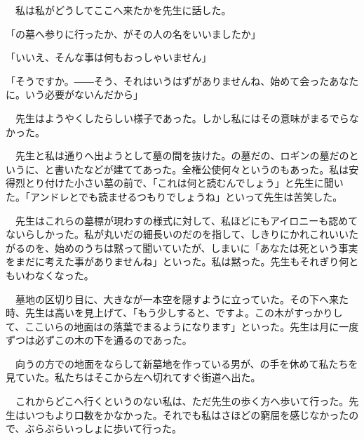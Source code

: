 \documentclass[a4j,onecolumn]{tarticle}
\begin{document}
　私は私がどうしてここへ来たかを先生に話した。\hbox{}\par{}
「の墓へ参りに行ったか、\hbox{}がその人の名をいいましたか」\par{}
「いいえ、\hbox{}そんな事は何もおっしゃいません」\par{}
「そうですか。\hbox{}――そう、\hbox{}それはいうはずがありませんね、\hbox{}始めて会ったあなたに。\hbox{}いう必要がないんだから」\par{}
　先生はようやくしたらしい様子であった。\hbox{}しかし私にはその意味がまるでらなかった。\hbox{}\par{}
　先生と私は通りへ出ようとして墓の間を抜けた。\hbox{}の墓だの、\hbox{}ロギンの墓だのというに、\hbox{}と書いたなどが建ててあった。\hbox{}全権公使何々というのもあった。\hbox{}私は安得烈とり付けた小さい墓の前で、\hbox{}「これは何と読むんでしょう」と先生に聞いた。\hbox{}「アンドレとでも読ませるつもりでしょうね」といって先生は苦笑した。\hbox{}\par{}
　先生はこれらの墓標が現わすの様式に対して、\hbox{}私ほどにもアイロニーも認めてないらしかった。\hbox{}私が丸いだの細長いのだのを指して、\hbox{}しきりにかれこれいいたがるのを、\hbox{}始めのうちは黙って聞いていたが、\hbox{}しまいに「あなたは死という事実をまだに考えた事がありませんね」といった。\hbox{}私は黙った。\hbox{}先生もそれぎり何ともいわなくなった。\hbox{}\par{}
　墓地の区切り目に、\hbox{}大きなが一本空を隠すように立っていた。\hbox{}その下へ来た時、\hbox{}先生は高いを見上げて、\hbox{}「もう少しすると、\hbox{}ですよ。\hbox{}この木がすっかりして、\hbox{}ここいらの地面はの落葉でまるようになります」といった。\hbox{}先生は月に一度ずつは必ずこの木の下を通るのであった。\hbox{}\par{}
　向うの方での地面をならして新墓地を作っている男が、\hbox{}の手を休めて私たちを見ていた。\hbox{}私たちはそこから左へ切れてすぐ街道へ出た。\hbox{}\par{}
　これからどこへ行くというのない私は、\hbox{}ただ先生の歩く方へ歩いて行った。\hbox{}先生はいつもより口数をかなかった。\hbox{}それでも私はさほどの窮屈を感じなかったので、\hbox{}ぶらぶらいっしょに歩いて行った。\hbox{}\par{}
\end{document}
